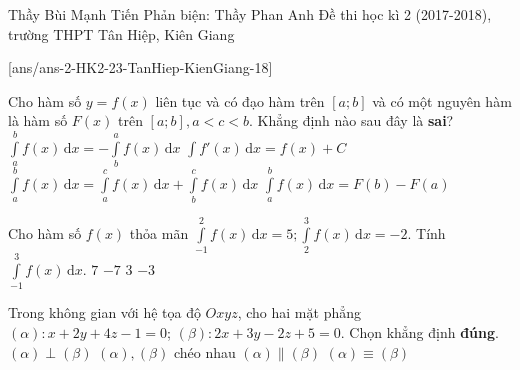 \begin{name}
{Thầy Bùi Mạnh Tiến 
	\newline Phản biện: Thầy Phan Anh}
{Đề thi học kì 2 (2017-2018), trường THPT Tân Hiệp, Kiên Giang}%
\end{name}
\setcounter{ex}{0}\setcounter{bt}{0}
[ans/ans-2-HK2-23-TanHiep-KienGiang-18]
\begin{ex}%
	Cho hàm số $y=f(x)$ liên tục và có đạo hàm trên $\left[a;b\right]$ và có một nguyên hàm là hàm số $F(x)$ trên $\left[a;b\right],a<c<b$. Khẳng định nào sau đây là \textbf{sai}?
	\choice
	{$\displaystyle\int\limits_a^b f(x)\mathrm{\,d}x=-\displaystyle\int\limits_b^a f(x)\mathrm{\,d}x$}
	{$\displaystyle\int f'(x)\mathrm{\,d}x=f(x)+C$}
	{\True $\displaystyle\int\limits_a^b f(x)\mathrm{\,d}x=\displaystyle\int\limits_a^c f(x)\mathrm{\,d}x+\displaystyle\int\limits_b^c f(x)\mathrm{\,d}x$}
	{$\displaystyle\int\limits_a^b f(x)\mathrm{\,d}x=F(b)-F(a)$}
\end{ex}
\begin{ex}%
	Cho hàm số $f(x)$ thỏa mãn $\displaystyle\int\limits_{-1}^2 f(x)\mathrm{\,d}x=5;\displaystyle\int\limits_2^3 f(x)\mathrm{\,d}x=-2$. Tính $\displaystyle\int\limits_{-1}^3 f(x)\mathrm{\,d}x$.
	\choice
	{$7$}
	{$-7$}
	{\True $3$}
	{$-3$}
\end{ex}
\begin{ex}%
	Trong không gian với hệ tọa độ $Oxyz$, cho hai mặt phẳng $\left(\alpha \right)\colon x+2y+4z-1=0$; $\left(\beta \right)\colon 2x+3y-2z+5=0$. Chọn khẳng định \textbf{đúng}.
	\choice
	{\True $\left(\alpha \right)\perp \left(\beta \right)$}
	{$\left(\alpha \right), \left(\beta \right)$ chéo nhau}
	{$\left(\alpha \right)\parallel \left(\beta \right)$}
	{$\left(\alpha \right)\equiv \left(\beta \right)$}
\end{ex}

